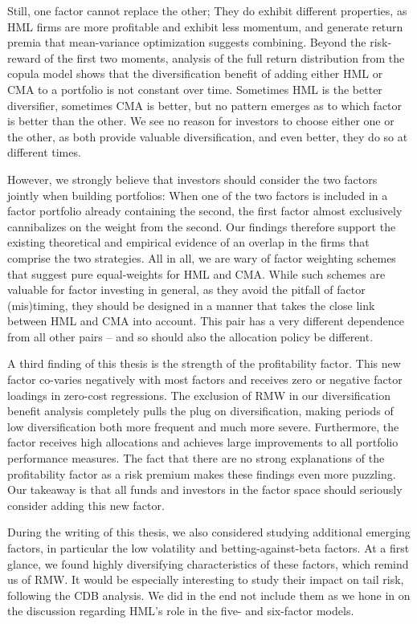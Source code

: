 Still, one factor cannot replace the other; They do exhibit different properties, as HML firms are more profitable and exhibit less momentum, and generate return premia that mean-variance optimization suggests combining. Beyond the risk-reward of the first two moments, analysis of the full return distribution from the copula model shows that the diversification benefit of adding either HML or CMA to a portfolio is not constant over time. Sometimes HML is the better diversifier, sometimes CMA is better, but no pattern emerges as to which factor is better than the other. We see no reason for investors to choose either one or the other, as both provide valuable diversification, and even better, they do so at different times.

However, we strongly believe that investors should consider the two factors jointly when building portfolios: When one of the two factors is included in a factor portfolio already containing the second, the first factor almost exclusively cannibalizes on the weight from the second. Our findings therefore support the existing theoretical and empirical evidence of an overlap in the firms that comprise the two strategies. All in all, we are wary of factor weighting schemes that suggest pure equal-weights for HML and CMA. While such schemes are valuable for factor investing in general, as they avoid the pitfall of factor (mis)timing, they should be designed in a manner that takes the close link between HML and CMA into account. This pair has a very different dependence from all other pairs -- and so should also the allocation policy be different.

A third finding of this thesis is the strength of the profitability factor. This new factor co-varies negatively with most factors and receives zero or negative factor loadings in zero-cost regressions. The exclusion of RMW in our diversification benefit analysis completely pulls the plug on diversification, making periods of low diversification both more frequent and much more severe. Furthermore, the factor receives high allocations and achieves large improvements to all portfolio performance measures. The fact that there are no strong explanations of the profitability factor as a risk premium makes these findings even more puzzling. Our takeaway is that all funds and investors in the factor space should seriously consider adding this new factor.

During the writing of this thesis, we also considered studying additional emerging factors, in particular the low volatility and betting-against-beta factors. At a first glance, we found highly diversifying characteristics of these factors, which remind us of RMW. It would be especially interesting to study their impact on tail risk, following the CDB analysis. We did in the end not include them as we hone in on the discussion regarding HML's role in the five- and six-factor models.

